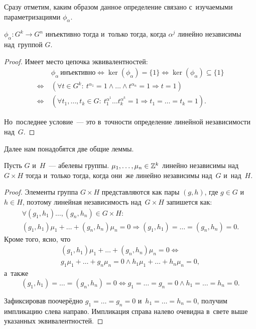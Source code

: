 \documentclass[a4paper,oneside]{article}
\begin{document}
Сразу отметим, каким образом данное определение связано с~изучаемыми параметризациями $\phi_\alpha$.

\begin{theorem}
    $\phi_\alpha : G^k \rightarrow G^n$ инъективно тогда и~только тогда, когда $\alpha^j$ линейно независимы над~группой $G$.
\end{theorem}

\begin{proof}
    Имеет место цепочка эквивалентностей:
    \begin{align*}
                       \ & \phi_\alpha\ \text{инъективно}
        \Leftrightarrow \ker(\phi_\alpha) = \{ 1 \}
        \Leftrightarrow \ker(\phi_\alpha) \subseteq \{ 1 \} \\
        \Leftrightarrow\ & (\forall t \in G^k{:}\ t^{\alpha_1} = 1 \wedge \ldots \wedge t^{\alpha_n} = 1 \Rightarrow t = 1) \\
        \Leftrightarrow\ & (\forall t_1, \ldots, t_k \in G{:}\ t_1^{\alpha^1} \ldots t_k^{\alpha^k} = 1 \Rightarrow t_1 = \ldots = t_k = 1).
    \end{align*}

    Но~последнее условие~— это в~точности определение линейной независимости над~$G$.
\end{proof}

Далее нам понадобятся две общие леммы.

\begin{lemma}
    Пусть $G$ и~$H$~— абелевы группы. $\mu_1, \ldots, \mu_n \in \mathbb{Z}^k$ линейно независимы над~$G \times H$
    тогда и~только тогда, когда они~же линейно независимы над~$G$ и~над~$H$.
\end{lemma}

\begin{proof}
    Элементы группа $G \times H$ представляются как пары $(g, h)$, где $g \in G$ и~$h \in H$, поэтому
    линейная независимость над~$G \times H$ запишется как:
    \begin{gather*}
        \forall (g_1, h_1) \ldots, (g_n, h_n) \in G \times H{:}\\ (g_1, h_1) \mu_1 + \ldots + (g_n, h_n) \mu_n = 0 \Rightarrow (g_1, h_1) = \ldots = (g_n, h_n) = 0.
    \end{gather*}
    Кроме того, ясно, что
    \begin{gather*}
        (g_1, h_1) \mu_1 + \ldots + (g_n, h_n) \mu_n = 0 \Leftrightarrow\\ g_1 \mu_1 + \ldots + g_n \mu_n = 0 \wedge h_1 \mu_1 + \ldots + h_n \mu_n = 0,
    \end{gather*}
    а~также
    $$
        (g_1, h_1) = \ldots = (g_n, h_n) = 0 \Leftrightarrow g_1 = \ldots = g_n = 0 \wedge h_1 = \ldots = h_n = 0.
    $$

    Зафиксировав поочерёдно $g_1 = \ldots = g_n = 0$ и~$h_1 = \ldots = h_n = 0$, получим импликацию слева направо.
    Импликация справа налево очевидна в~свете выше указанных эквивалентностей.
\end{proof}
\end{document}
